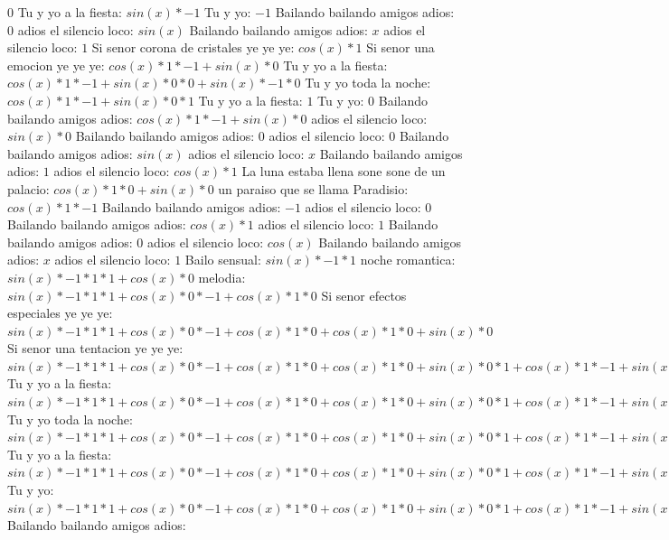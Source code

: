\documentclass{article}
\begin{document}
$0$  \newline Tu y yo a la fiesta: $sin(x)*-1$ Tu y yo: $-1$ Bailando bailando amigos adios: $0$  \newline adios el silencio loco: $sin(x)$  \newline Bailando bailando amigos adios: $x$ adios el silencio loco: $1$  \newline Si senor corona de cristales ye ye ye: $cos(x)*1$ Si senor una emocion ye ye ye: $cos(x)*1*-1+sin(x)*0$ Tu y yo a la fiesta: ${cos(x)*1*-1+sin(x)*0}*0+sin(x)*-1*0$ Tu y yo toda la noche: ${cos(x)*1*-1+sin(x)*0}*1$ Tu y yo a la fiesta: $1$ Tu y yo: $0$  \newline Bailando bailando amigos adios: $cos(x)*1*-1+sin(x)*0$  \newline adios el silencio loco: $sin(x)*0$ Bailando bailando amigos adios: $0$ adios el silencio loco: $0$  \newline Bailando bailando amigos adios: $sin(x)$  \newline adios el silencio loco: $x$ Bailando bailando amigos adios: $1$  \newline adios el silencio loco: $cos(x)*1$ La luna estaba llena sone sone de un palacio: $cos(x)*1*0+sin(x)*0$ un paraiso que se llama Paradisio: $cos(x)*1*-1$ Bailando bailando amigos adios: $-1$ adios el silencio loco: $0$  \newline Bailando bailando amigos adios: $cos(x)*1$ adios el silencio loco: $1$ Bailando bailando amigos adios: $0$  \newline adios el silencio loco: $cos(x)$  \newline Bailando bailando amigos adios: $x$ adios el silencio loco: $1$  \newline Bailo sensual: $sin(x)*-1*1$ noche romantica: $sin(x)*-1*1*1+cos(x)*0$ melodia: ${sin(x)*-1*1*1+cos(x)*0}*-1+cos(x)*1*0$ Si senor efectos especiales ye ye ye: ${sin(x)*-1*1*1+cos(x)*0}*-1+cos(x)*1*0+cos(x)*1*0+sin(x)*0$ Si senor una tentacion ye ye ye: ${{sin(x)*-1*1*1+cos(x)*0}*-1+cos(x)*1*0+cos(x)*1*0+sin(x)*0}*1+{cos(x)*1*-1+sin(x)*0}*0$ Tu y yo a la fiesta: ${{sin(x)*-1*1*1+cos(x)*0}*-1+cos(x)*1*0+cos(x)*1*0+sin(x)*0}*1+{cos(x)*1*-1+sin(x)*0}*0+{cos(x)*1*-1+sin(x)*0}*0+sin(x)*-1*0$ Tu y yo toda la noche: ${{{sin(x)*-1*1*1+cos(x)*0}*-1+cos(x)*1*0+cos(x)*1*0+sin(x)*0}*1+{cos(x)*1*-1+sin(x)*0}*0+{cos(x)*1*-1+sin(x)*0}*0+sin(x)*-1*0}*1+{{cos(x)*1*-1+sin(x)*0}*1+sin(x)*-1*0}*0$ Tu y yo a la fiesta: ${{{sin(x)*-1*1*1+cos(x)*0}*-1+cos(x)*1*0+cos(x)*1*0+sin(x)*0}*1+{cos(x)*1*-1+sin(x)*0}*0+{cos(x)*1*-1+sin(x)*0}*0+sin(x)*-1*0}*1+{{cos(x)*1*-1+sin(x)*0}*1+sin(x)*-1*0}*0+{{cos(x)*1*-1+sin(x)*0}*1+sin(x)*-1*0}*0+sin(x)*-1*1*0$ Tu y yo: ${{{sin(x)*-1*1*1+cos(x)*0}*-1+cos(x)*1*0+cos(x)*1*0+sin(x)*0}*1+{cos(x)*1*-1+sin(x)*0}*0+{cos(x)*1*-1+sin(x)*0}*0+sin(x)*-1*0}*1+{{cos(x)*1*-1+sin(x)*0}*1+sin(x)*-1*0}*0+{{cos(x)*1*-1+sin(x)*0}*1+sin(x)*-1*0}*0+sin(x)*-1*1*0+{{cos(x)*1*-1+sin(x)*0}*1+sin(x)*-1*0}*0+sin(x)*-1*1*0+sin(x)*-1*1*0+cos(x)*0$ Bailando bailando amigos adios: 
\end{document}
